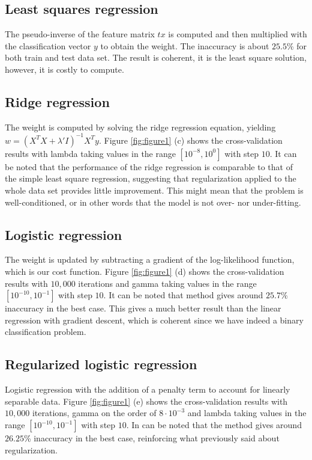 \documentclass[10pt,conference,compsocconf]{IEEEtran}
\begin{document}
\subsection{Least squares regression}
The pseudo-inverse of the feature matrix $tx$ is computed and then multiplied
with the classification vector $y$ to obtain the weight.
The inaccuracy is about $25.5$\% for both train and test data set. The result
is coherent, it is the least square solution, however, it is costly to compute.

\subsection{Ridge regression}
The weight is computed by solving the ridge regression equation, yielding $w =
(X^{T}X + \lambda'I)^{-1}X^{T}y$.
Figure \ref{fig:figure1} (c) shows the cross-validation results with lambda
taking values in the range $[10^{-8}, 10^{0}]$ with step $10$. It can be noted
that the performance of the ridge regression is comparable to that of the simple
least square regression, suggesting that regularization applied to the whole
data set provides little improvement. This might mean that the problem is
well-conditioned, or in other words that the model is not over- nor under-fitting.

\subsection{Logistic regression}
The weight is updated by subtracting a gradient of the log-likelihood function,
which is our cost function. Figure \ref{fig:figure1} (d) shows the
cross-validation results with $10,000$ iterations and gamma taking values in the
range $[10^{-10}, 10^{-1}]$ with step $10$. It can be noted that method gives
around $25.7$\% inaccuracy in the best case. This gives a much better result than
the linear regression with gradient descent, which is coherent since we have
indeed a binary classification problem.

\subsection{Regularized logistic regression}
Logistic regression with the addition of a penalty term to account for linearly
separable data. Figure \ref{fig:figure1} (e) shows the cross-validation results
with $10,000$ iterations, gamma on the order of $8 \cdot 10^{-3}$ and lambda
taking values in the range $[10^{-10}, 10^{-1}]$ with step $10$. In can be noted
that the method gives around $26.25$\% inaccuracy in the best case, reinforcing
what previously said about regularization.
\end{document}
